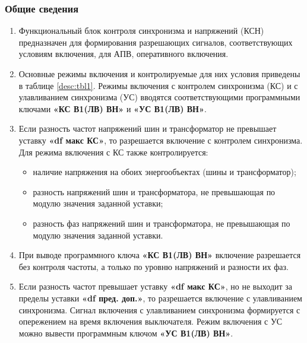 \color{black}

\subsubsection{Общие сведения}

\begin{enumerate}[label=\arabic{section}.\arabic{subsection}.\arabic{subsubsection}.\arabic*,  align=left, labelsep=4pt, leftmargin=0pt, itemindent=57pt]

\item
Функциональный блок контроля синхронизма и напряжений (КСН) предназначен для
формирования разрешающих сигналов, соответствующих условиям включения, для АПВ, оперативного
включения.

\item
Основные режимы включения и контролируемые для них условия приведены в таблице \ref{desc:tbl1}.
Режимы включения с контролем синхронизма (КС) и с улавливанием синхронизма
(УС) вводятся соответствующими программными ключами \textbf{«КС В1(ЛВ) ВН»} и \textbf{«УС В1(ЛВ) ВН»}.

\item
Если разность частот напряжений шин и трансформатор не превышает уставку \textbf{«df макс КС»},
то разрешается включение с контролем синхронизма. Для режима включения с КС также контролируется:
\begin{itemize}
\item наличие напряжения на обоих энергообъектах (шины и трансформатор);
\item разность напряжений шин и трансформатора, не превышающая по модулю значения заданной уставки;
\item разность фаз напряжений шин и трансформатора, не превышающая по модулю значения заданной уставки.
\end{itemize}

\item
При выводе программного ключа \textbf{«КС В1(ЛВ) ВН»} включение разрешается без контроля частоты,
а только по уровню напряжений и разности их фаз.

\item
Если разность частот превышает уставку \textbf{«df макс КС»}, но не выходит за пределы уставки \textbf{«df
пред. доп.»}, то разрешается включение с улавливанием синхронизма. Сигнал включения с
улавливанием синхронизма формируется с опережением на время включения выключателя. Режим
включения с УС можно вывести программным ключом \textbf{«УС В1(ЛВ) ВН»}.


\end{enumerate}
